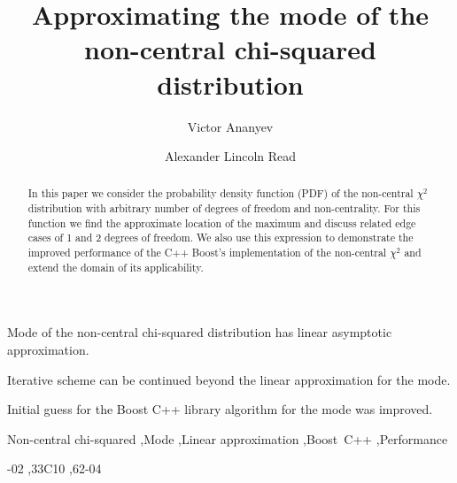 \documentclass[final,5p,twocolumn,times,authoryear]{elsarticle}
\begin{document}
\begin{frontmatter}

\title{Approximating the mode of the non-central chi-squared distribution}

\author[uio]{Victor Ananyev}
\author[uio]{Alexander Lincoln Read}

\begin{abstract}
In this paper we consider the probability density function (PDF) of the non-central $\chi^2$ distribution with arbitrary number of degrees of freedom and non-centrality. For this function we find the approximate location of the maximum and discuss related edge cases of 1 and 2 degrees of freedom. We also use this expression to demonstrate the improved performance of the C++ Boost's implementation of the non-central $\chi^2$ and extend the domain of its applicability.
\end{abstract}

\begin{highlights}
\item Mode of the non-central chi-squared distribution has linear asymptotic approximation.
\item Iterative scheme can be continued beyond the linear approximation for the mode.
\item Initial guess for the Boost C++ library algorithm for the mode was improved.
\end{highlights}

\begin{keyword}
Non-central chi-squared \sep Mode \sep Linear approximation \sep Boost~C++ \sep Performance

-02 \sep 33C10 \sep 62-04
\end{keyword}

\end{frontmatter}
\end{document}
